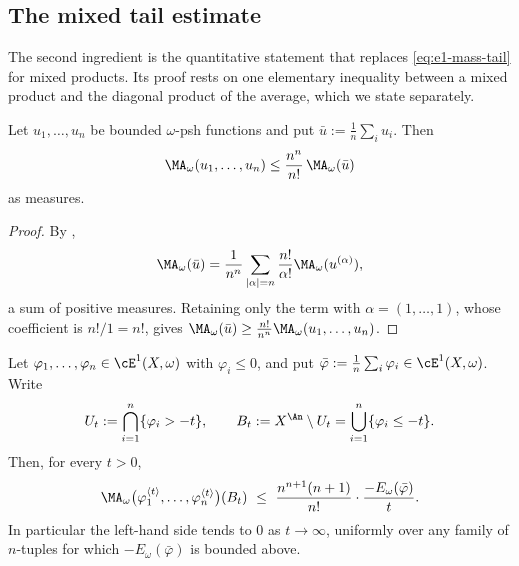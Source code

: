 \subsection{The mixed tail estimate}
\label{sec:ch26-mixed-tail}

The second ingredient is the quantitative statement that replaces
\eqref{eq:e1-mass-tail} for mixed products.  Its proof rests on one
elementary inequality between a mixed product and the diagonal product of the
average, which we state separately.

\begin{lemma}
\label{lem:ch26-average-domination}
Let \(u_1,\ldots,u_n\) be bounded \(\omega\)-psh functions and put
\(\bar u:=\frac1n\sum_iu_i\).  Then
\begin{equation}
\label{eq:ch26-average-domination}
 \MA_\omega(u_1,\ldots,u_n)
 \leq\frac{n^n}{n!}\,\MA_\omega(\bar u)
\end{equation}
as measures.
\end{lemma}

\begin{proof}
By ,
\[
 \MA_\omega(\bar u)
 =\frac1{n^n}\sum_{|\alpha|=n}\frac{n!}{\alpha!}
   \MA_\omega(u^{(\alpha)}),
\]
a sum of positive measures.  Retaining only the term with
\(\alpha=(1,\ldots,1)\), whose coefficient is \(n!/1=n!\), gives
\(\MA_\omega(\bar u)\geq\frac{n!}{n^n}\MA_\omega(u_1,\ldots,u_n)\).
\end{proof}

\begin{lemma}
\label{lem:ch26-mixed-tail}
Let \(\varphi_1,\ldots,\varphi_n\in\cE^1(X,\omega)\) with
\(\varphi_i\leq0\), and put
\(\bar\varphi:=\frac1n\sum_i\varphi_i\in\cE^1(X,\omega)\).  Write
\[
 U_t:=\bigcap_{i=1}^n\{\varphi_i>-t\},
 \qquad
 B_t:=X^{\An}\setminus U_t=\bigcup_{i=1}^n\{\varphi_i\leq-t\}.
\]
Then, for every \(t>0\),
\begin{equation}
\label{eq:ch26-mixed-tail}
 \MA_\omega\bigl(\varphi_1^{\langle t\rangle},\ldots,
   \varphi_n^{\langle t\rangle}\bigr)(B_t)
 \ \leq\ \frac{n^{n+1}(n+1)}{n!}\cdot
   \frac{-E_\omega(\bar\varphi)}{t}.
\end{equation}
In particular the left-hand side tends to \(0\) as \(t\to\infty\), uniformly
over any family of \(n\)-tuples for which \(-E_\omega(\bar\varphi)\) is
bounded above.
\end{lemma}

